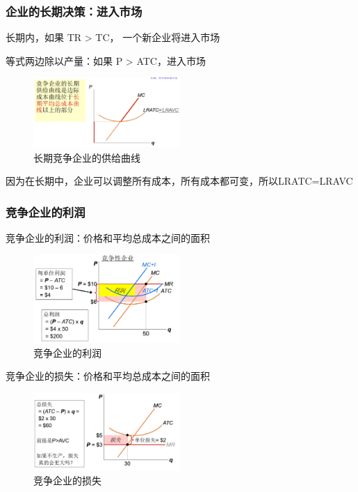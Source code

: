 \documentclass[12pt, a4paper]{article}
\begin{document}
\subsubsection{企业的长期决策：进入市场}

长期内，如果 TR > TC， 一个新企业将进入市场

等式两边除以产量：如果 P > ATC，进入市场

\begin{figure}[H] 
  \centering %
  \includegraphics[width=0.5\textwidth]{长期供给曲线.png} 
  \caption{长期竞争企业的供给曲线} %
\end{figure}
因为在长期中，企业可以调整所有成本，所有成本都可变，所以LRATC=LRAVC

\subsubsection{竞争企业的利润}

竞争企业的利润：价格和平均总成本之间的面积

\begin{figure}[H] 
  \centering %
  \includegraphics[width=0.5\textwidth]{竞争企业的利润.png} 
  \caption{竞争企业的利润} %
\end{figure}

竞争企业的损失：价格和平均总成本之间的面积

\begin{figure}[H] 
  \centering %
  \includegraphics[width=0.5\textwidth]{竞争企业的损失.png} 
  \caption{竞争企业的损失} %
\end{figure}
\end{document}
